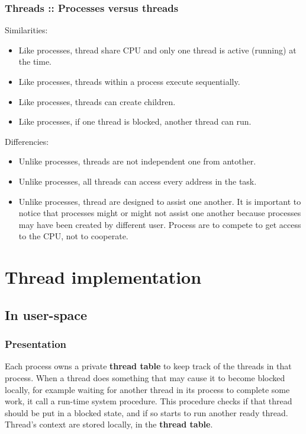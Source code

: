 \begin{frame}
  \frametitle{Threads :: Processes versus threads}

Similarities:

\begin{itemize}
\item
Like processes, thread share CPU and only one thread is active (running) at the time.
\item
Like processes, threads within a process execute sequentially.
\item
Like processes, threads can create children.
\item
Like processes, if one thread is blocked, another thread can run.
\end{itemize}

\-

Differencies:

\begin{itemize}
\item
Unlike processes, threads are not independent one from antother.
\item
Unlike processes, all threads can access every address in the task.
\item
Unlike processes, thread are designed to assist one another. It is important to notice that processes might or might not assist one another because processes may have been created by different user. Process are to compete to get access to the CPU, not to cooperate.
\end{itemize}

\end{frame}



%
%

\section{Thread implementation}

\subsection{In user-space}


\begin{frame}
  \frametitle{Presentation}

Each process owns a private \textbf{thread table} to keep track of the threads in that process. When a thread does something that may cause it to become blocked locally, for example waiting for another thread in its process to complete some work, it call a run-time system procedure. This procedure checks if that thread should be put in a blocked state, and if so starts to run another ready thread. Thread's context are stored locally, in the \textbf{thread table}.

\end{frame}

